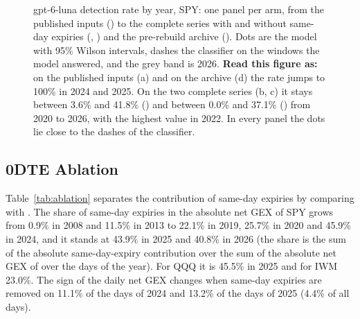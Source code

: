 \begin{figure}[H]
\centering
\resultfigure{\figComplete}
\caption{gpt-6-luna detection rate by year, SPY: one panel per arm, from the published inputs () to the complete series with and without same-day expiries (, ) and the pre-rebuild archive (). Dots are the model with 95\% Wilson intervals, dashes the classifier on the windows the model answered, and the grey band is 2026. \textbf{Read this figure as:} on the published inputs (a) and on the archive (d) the rate jumps to 100\% in 2024 and 2025. On the two complete series (b, c) it stays between 3.6\% and 41.8\% () and between 0.0\% and 37.1\% () from 2020 to 2026, with the highest value in 2022. In every panel the dots lie close to the dashes of the classifier.}
\label{fig:complete}
\end{figure}

\subsection{0DTE Ablation}
\label{sec:results:ablation}

Table~\ref{tab:ablation} separates the contribution of same-day expiries by comparing  with .
The share of same-day expiries in the absolute net GEX of SPY grows from 0.9\% in 2008 and 11.5\% in 2013 to 22.1\% in 2019, 25.7\% in 2020 and 45.9\% in 2024, and it stands at 43.9\% in 2025 and 40.8\% in 2026 (the share is the sum of the absolute same-day-expiry contribution over the sum of the absolute net GEX of  over the days of the year). For QQQ it is 45.5\% in 2025 and for IWM 23.0\%. The sign of the daily net GEX changes when same-day expiries are removed on 11.1\% of the days of 2024 and 13.2\% of the days of 2025 (4.4\% of all days).

